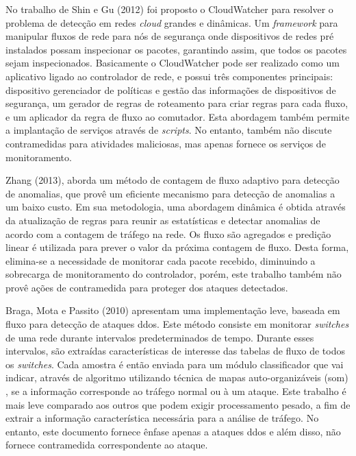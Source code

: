 No trabalho de Shin e Gu (2012)\nocite{Shin:2012} foi proposto o CloudWatcher para resolver o problema de detecção em redes \textit{cloud} grandes e dinâmicas. Um \textit{framework} para manipular fluxos de rede para nós de segurança onde dispositivos de redes pré instalados possam inspecionar os pacotes, garantindo assim, que todos os pacotes sejam inspecionados. Basicamente o CloudWatcher pode ser realizado como um aplicativo ligado ao controlador de rede, e possui três componentes principais: dispositivo gerenciador de políticas e gestão das informações de dispositivos de segurança, um gerador de regras de roteamento para criar regras para cada fluxo, e um aplicador da regra de fluxo ao comutador. Esta abordagem também permite a implantação de serviços através de \textit{scripts}. No entanto, também não discute contramedidas para atividades maliciosas, mas apenas fornece os serviços de monitoramento.


Zhang (2013)\nocite{Zhang:2013}, aborda um método de contagem de fluxo adaptivo para detecção de anomalias, que  provê um eficiente mecanismo para detecção de anomalias a um baixo custo. Em sua metodologia, uma abordagem dinâmica é obtida através da atualização de regras para reunir as estatísticas e detectar anomalias de acordo com a contagem de tráfego na rede. Os fluxo são agregados e predição linear é utilizada para prever o valor da próxima contagem de fluxo. Desta forma, elimina-se a necessidade de monitorar cada pacote recebido, diminuindo a sobrecarga de monitoramento do controlador, porém, este trabalho também não provê ações de contramedida para proteger dos ataques detectados.


Braga, Mota e Passito (2010)\nocite{Braga:2010} apresentam uma implementação leve, baseada em fluxo para detecção de ataques \gls{ddos}. Este método consiste em monitorar \textit{switches} de uma rede durante intervalos predeterminados de tempo. Durante esses intervalos, são extraídas características de interesse das tabelas de fluxo de todos os \textit{switches}. Cada amostra é então enviada para um módulo classificador que vai indicar, através de algoritmo utilizando técnica de mapas auto-organizáveis (\gls{som}) \cite{Kohonen:1990}, se a informação corresponde ao tráfego normal ou à um ataque. Este trabalho é mais leve comparado aos outros que podem exigir processamento pesado, a fim de extrair a informação característica necessária para a análise de tráfego. No entanto, este documento fornece ênfase apenas a ataques \gls{ddos} e além disso, não fornece contramedida correspondente ao ataque.

